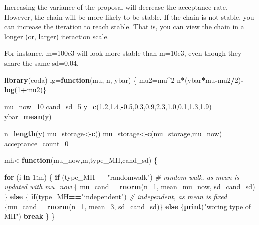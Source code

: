 \documentclass[
]{book}
\newenvironment{Shaded}{\begin{snugshade}}{\end{snugshade}}
\newcommand{\CommentTok}[1]{\textcolor[rgb]{0.56,0.35,0.01}{\textit{#1}}}
\newcommand{\ControlFlowTok}[1]{\textcolor[rgb]{0.13,0.29,0.53}{\textbf{#1}}}
\newcommand{\DataTypeTok}[1]{\textcolor[rgb]{0.13,0.29,0.53}{#1}}
\newcommand{\DecValTok}[1]{\textcolor[rgb]{0.00,0.00,0.81}{#1}}
\newcommand{\FloatTok}[1]{\textcolor[rgb]{0.00,0.00,0.81}{#1}}
\newcommand{\KeywordTok}[1]{\textcolor[rgb]{0.13,0.29,0.53}{\textbf{#1}}}
\newcommand{\NormalTok}[1]{#1}
\newcommand{\OperatorTok}[1]{\textcolor[rgb]{0.81,0.36,0.00}{\textbf{#1}}}
\newcommand{\StringTok}[1]{\textcolor[rgb]{0.31,0.60,0.02}{#1}}
\begin{document}
Increasing the variance of the proposal will decrease the acceptance rate. However, the chain will be more likely to be stable. If the chain is not stable, you can increase the iteration to reach stable. That is, you can view the chain in a longer (or, larger) iteraction scale.

For instance, m=100e3 will look more stable than m=10e3, even though they share the same sd=0.04.

\begin{Shaded}
\begin{Highlighting}[]
\KeywordTok{library}\NormalTok{(coda)}
\NormalTok{lg=}\ControlFlowTok{function}\NormalTok{(mu, n, ybar)}
\NormalTok{\{ mu2=mu}\OperatorTok{^}\DecValTok{2}
\NormalTok{n}\OperatorTok{*}\NormalTok{(ybar}\OperatorTok{*}\NormalTok{mu}\OperatorTok{-}\NormalTok{mu2}\OperatorTok{/}\DecValTok{2}\NormalTok{)}\OperatorTok{-}\KeywordTok{log}\NormalTok{(}\DecValTok{1}\OperatorTok{+}\NormalTok{mu2)\}}

\NormalTok{mu_now=}\DecValTok{10}
\NormalTok{cand_sd=}\DecValTok{5}
\NormalTok{y=}\KeywordTok{c}\NormalTok{(}\FloatTok{1.2}\NormalTok{,}\FloatTok{1.4}\NormalTok{,}\OperatorTok{-}\FloatTok{0.5}\NormalTok{,}\FloatTok{0.3}\NormalTok{,}\FloatTok{0.9}\NormalTok{,}\FloatTok{2.3}\NormalTok{,}\FloatTok{1.0}\NormalTok{,}\FloatTok{0.1}\NormalTok{,}\FloatTok{1.3}\NormalTok{,}\FloatTok{1.9}\NormalTok{)}
\NormalTok{ybar=}\KeywordTok{mean}\NormalTok{(y)}

\NormalTok{n=}\KeywordTok{length}\NormalTok{(y)}
\NormalTok{mu_storage<-}\KeywordTok{c}\NormalTok{()}
\NormalTok{mu_storage<-}\KeywordTok{c}\NormalTok{(mu_storage,mu_now)}
\NormalTok{acceptance_count=}\DecValTok{0}

\NormalTok{mh<-}\ControlFlowTok{function}\NormalTok{(mu_now,m,type_MH,cand_sd)}
\NormalTok{\{}
  
  \ControlFlowTok{for}\NormalTok{ (i }\ControlFlowTok{in} \DecValTok{1}\OperatorTok{:}\NormalTok{m)}
\NormalTok{  \{}
    \ControlFlowTok{if}\NormalTok{ (type_MH}\OperatorTok{==}\StringTok{"randomwalk"}\NormalTok{)  }\CommentTok{# random walk, as mean is updated with mu_now}
\NormalTok{    \{}
\NormalTok{      mu_cand =}\StringTok{ }\KeywordTok{rnorm}\NormalTok{(}\DataTypeTok{n=}\DecValTok{1}\NormalTok{, }\DataTypeTok{mean=}\NormalTok{mu_now, }\DataTypeTok{sd=}\NormalTok{cand_sd)}
\NormalTok{    \}}
    \ControlFlowTok{else}
\NormalTok{    \{}
      \ControlFlowTok{if}\NormalTok{(type_MH}\OperatorTok{==}\StringTok{"independent"}\NormalTok{)  }\CommentTok{# independent, as mean is fixed}
\NormalTok{      \{mu_cand =}\StringTok{ }\KeywordTok{rnorm}\NormalTok{(}\DataTypeTok{n=}\DecValTok{1}\NormalTok{, }\DataTypeTok{mean=}\DecValTok{3}\NormalTok{, }\DataTypeTok{sd=}\NormalTok{cand_sd)\}}
      \ControlFlowTok{else}
\NormalTok{      \{}\KeywordTok{print}\NormalTok{(}\StringTok{"woring type of MH"}\NormalTok{)}
        \ControlFlowTok{break}
\NormalTok{      \}}
\NormalTok{    \}}
    

\end{Highlighting}
\end{Shaded}
\end{document}

